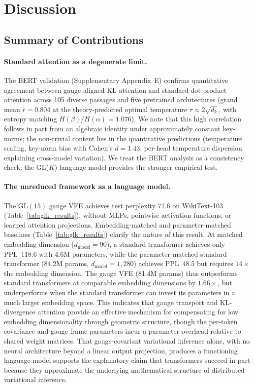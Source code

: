 \documentclass[twoside,11pt]{article}
\begin{document}


\section{Discussion}

\subsection{Summary of Contributions}

\paragraph{Standard attention as a degenerate limit.} The BERT validation (Supplementary Appendix~E) confirms quantitative agreement between gauge-aligned KL attention and standard dot-product attention across 105 diverse passages and five pretrained architectures (grand mean $\bar{r} = 0.804$ at the theory-predicted optimal temperature $\tau \approx 2\sqrt{d_k}$, with entropy matching $H(\beta)/H(\alpha) = 1.076$). We note that this high correlation follows in part from an algebraic identity under approximately constant key-norms; the non-trivial content lies in the quantitative predictions (temperature scaling, key-norm bias with Cohen's $d = 1.43$, per-head temperature dispersion explaining cross-model variation). We treat the BERT analysis as a consistency check; the GL($K$) language model provides the stronger empirical test.

\paragraph{The unreduced framework as a language model.} The $\mathrm{GL}(15)$ gauge VFE achieves test perplexity 71.6 on WikiText-103 (Table~\ref{tab:glk_results}), without MLPs, pointwise activation functions, or learned attention projections. Embedding-matched and parameter-matched baselines (Table~\ref{tab:glk_results}) clarify the nature of this result. At matched embedding dimension ($d_{\text{model}} = 90$), a standard transformer achieves only PPL~118.6 with 4.6M parameters, while the parameter-matched standard transformer (84.2M params, $d_{\text{model}} = 1{,}280$) achieves PPL~48.5 but requires $14\times$ the embedding dimension. The gauge VFE (81.4M params) thus outperforms standard transformers at comparable embedding dimensions by $1.66\times$, but underperforms when the standard transformer can invest its parameters in a much larger embedding space. This indicates that gauge transport and KL-divergence attention provide an effective mechanism for compensating for low embedding dimensionality through geometric structure, though the per-token covariance and gauge frame parameters incur a parameter overhead relative to shared weight matrices. That gauge-covariant variational inference alone, with no neural architecture beyond a linear output projection, produces a functioning language model supports the explanatory claim that transformers succeed in part because they approximate the underlying mathematical structure of distributed variational inference.
\end{document}
